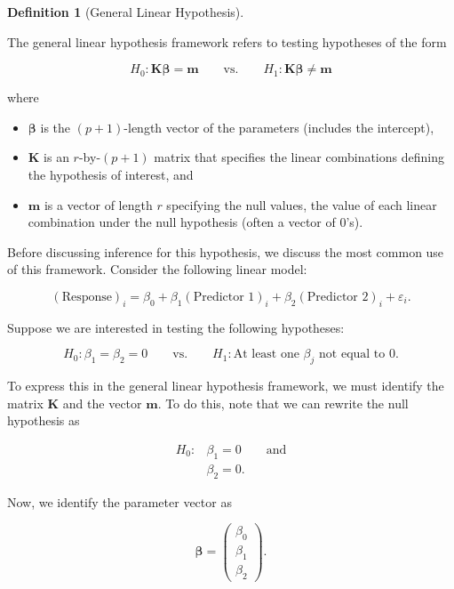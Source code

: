 \documentclass[
  letterpaper,
  DIV=11,
  numbers=noendperiod]{scrreprt}
\providecommand{\tightlist}{%
  \setlength{\itemsep}{0pt}\setlength{\parskip}{0pt}}\usepackage{longtable,booktabs,array}
\theoremstyle{definition}
\newtheorem{definition}{Definition}[chapter]
\theoremstyle{definition}
\theoremstyle{remark}
\begin{document}
\begin{definition}[General Linear
Hypothesis]\protect\hypertarget{def-general-linear-hypothesis}{}\label{def-general-linear-hypothesis}

The general linear hypothesis framework refers to testing hypotheses of
the form

\[H_0: \mathbf{K}\boldsymbol{\beta} = \mathbf{m} \qquad \text{vs.} \qquad H_1: \mathbf{K}\boldsymbol{\beta} \neq \mathbf{m}\]

where

\begin{itemize}
\tightlist
\item
  \(\boldsymbol{\beta}\) is the \((p+1)\)-length vector of the
  parameters (includes the intercept),
\item
  \(\mathbf{K}\) is an \(r\)-by-\((p+1)\) matrix that specifies the
  linear combinations defining the hypothesis of interest, and
\item
  \(\mathbf{m}\) is a vector of length \(r\) specifying the null values,
  the value of each linear combination under the null hypothesis (often
  a vector of 0's).
\end{itemize}

\end{definition}

Before discussing inference for this hypothesis, we discuss the most
common use of this framework. Consider the following linear model:

\[(\text{Response})_i = \beta_0 + \beta_1 (\text{Predictor 1})_i + \beta_2 (\text{Predictor 2})_i + \varepsilon_i.\]

Suppose we are interested in testing the following hypotheses:

\[H_0: \beta_1 = \beta_2 = 0 \qquad \text{vs.} \qquad H_1: \text{At least one } \beta_j \text{ not equal to 0}.\]

To express this in the general linear hypothesis framework, we must
identify the matrix \(\mathbf{K}\) and the vector \(\mathbf{m}\). To do
this, note that we can rewrite the null hypothesis as

\[
\begin{aligned}
  H_0: & \beta_1 = 0 \qquad \text{and} \\
  & \beta_2 = 0.
\end{aligned}
\]

Now, we identify the parameter vector as

\[\boldsymbol{\beta} = \begin{pmatrix} 
\beta_0 \\
\beta_1 \\
\beta_2 \end{pmatrix}.\]
\end{document}

